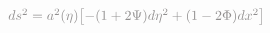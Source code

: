\documentclass[preview]{standalone}
\begin{document}
$ \textcolor{Gray}{ds^2 = a^2(\eta) \bigl[ -(1+2 \Psi)d \eta^2 + (1 - 2 \Phi)dx^2 \bigr]}
$
\end{document}
